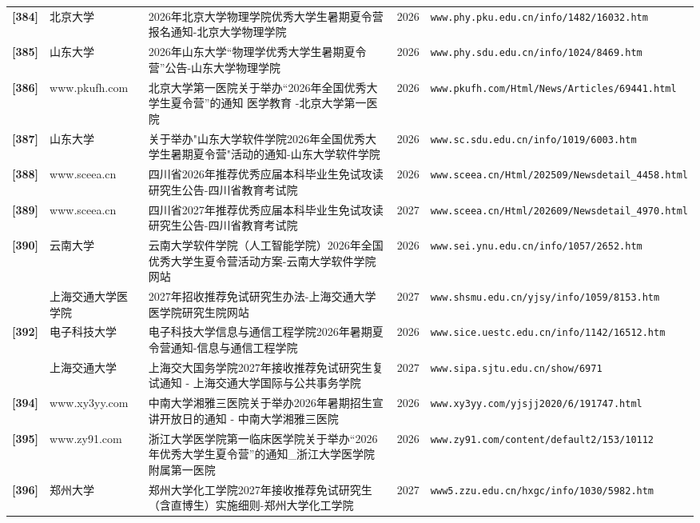 {\begin{longtable}{@{}p{1.15cm}p{2.9cm}p{6.3cm}p{0.85cm}p{5.0cm}@{}}
\textbf{[384]} & 北京大学 & 2026年北京大学物理学院优秀大学生暑期夏令营报名通知-北京大学物理学院 & 2026 & \texttt{www.phy.pku.edu.cn/info/1482/16032.htm} \\
\textbf{[385]} & 山东大学 & 2026年山东大学“物理学优秀大学生暑期夏令营”公告-山东大学物理学院 & 2026 & \texttt{www.phy.sdu.edu.cn/info/1024/8469.htm} \\
\textbf{[386]} & www.pkufh.com & 北京大学第一医院关于举办“2026年全国优秀大学生夏令营”的通知 医学教育 -北京大学第一医院 & 2026 & \texttt{www.pkufh.com/Html/News/Articles/69441.html} \\
\textbf{[387]} & 山东大学 & 关于举办"山东大学软件学院2026年全国优秀大学生暑期夏令营"活动的通知-山东大学软件学院 & 2026 & \texttt{www.sc.sdu.edu.cn/info/1019/6003.htm} \\
\textbf{[388]} & www.sceea.cn & 四川省2026年推荐优秀应届本科毕业生免试攻读研究生公告-四川省教育考试院 & 2026 & \texttt{www.sceea.cn/Html/202509/Newsdetail\_4458.html} \\
\textbf{[389]} & www.sceea.cn & 四川省2027年推荐优秀应届本科毕业生免试攻读研究生公告-四川省教育考试院 & 2027 & \texttt{www.sceea.cn/Html/202609/Newsdetail\_4970.html} \\
\textbf{[390]} & 云南大学 & 云南大学软件学院（人工智能学院）2026年全国优秀大学生夏令营活动方案-云南大学软件学院网站 & 2026 & \texttt{www.sei.ynu.edu.cn/info/1057/2652.htm} \\
[391] & 上海交通大学医学院 & 2027年招收推荐免试研究生办法-上海交通大学医学院研究生院网站 & 2027 & \texttt{www.shsmu.edu.cn/yjsy/info/1059/8153.htm} \\
\textbf{[392]} & 电子科技大学 & 电子科技大学信息与通信工程学院2026年暑期夏令营通知-信息与通信工程学院 & 2026 & \texttt{www.sice.uestc.edu.cn/info/1142/16512.htm} \\
[393] & 上海交通大学 & 上海交大国务学院2027年接收推荐免试研究生复试通知 - 上海交通大学国际与公共事务学院 & 2027 & \texttt{www.sipa.sjtu.edu.cn/show/6971} \\
\textbf{[394]} & www.xy3yy.com & 中南大学湘雅三医院关于举办2026年暑期招生宣讲开放日的通知 - 中南大学湘雅三医院 & 2026 & \texttt{www.xy3yy.com/yjsjj2020/6/191747.html} \\
\textbf{[395]} & www.zy91.com & 浙江大学医学院第一临床医学院关于举办“2026年优秀大学生夏令营”的通知\_浙江大学医学院附属第一医院 & 2026 & \texttt{www.zy91.com/content/default2/153/10112} \\
\textbf{[396]} & 郑州大学 & 郑州大学化工学院2027年接收推荐免试研究生（含直博生）实施细则-郑州大学化工学院 & 2027 & \texttt{www5.zzu.edu.cn/hxgc/info/1030/5982.htm} \\

\end{longtable}}
